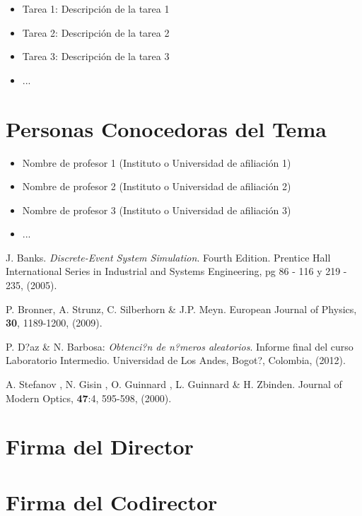 \documentclass[12pt]{article}
\begin{document}
\begin{itemize}
	\item Tarea 1: Descripci\'on de la tarea 1
	\item Tarea 2: Descripci\'on de la tarea 2
	\item Tarea 3: Descripci\'on de la tarea 3
	\item ...
\end{itemize}

\section{Personas Conocedoras del Tema}


\begin{itemize}
	\item Nombre de profesor 1 (Instituto o Universidad de afiliaci\'on 1)
	\item Nombre de profesor 2 (Instituto o Universidad de afiliaci\'on 2)
	\item Nombre de profesor 3 (Instituto o Universidad de afiliaci\'on 3)
	\item ...
\end{itemize}


\begin{thebibliography}{10}

 J. Banks. \textit{Discrete-Event System Simulation}. Fourth Edition. Prentice Hall International Series in Industrial and Systems Engineering, pg 86 - 116 y 219 - 235, (2005).

 P. Bronner, A. Strunz, C. Silberhorn \& J.P. Meyn. European Journal of Physics, \textbf{30}, 1189-1200, (2009).

 P. D?az \& N. Barbosa: \textit{Obtenci?n de n?meros aleatorios}. Informe final del curso Laboratorio Intermedio. Universidad de Los Andes, Bogot?, Colombia, (2012).

 A. Stefanov , N. Gisin , O. Guinnard , L. Guinnard \& H. Zbinden. Journal of Modern Optics, \textbf{47}:4, 595-598, (2000).

\end{thebibliography}

\section*{Firma del Director}
\vspace{1.5cm}

\section*{Firma del Codirector	}
\end{document}

